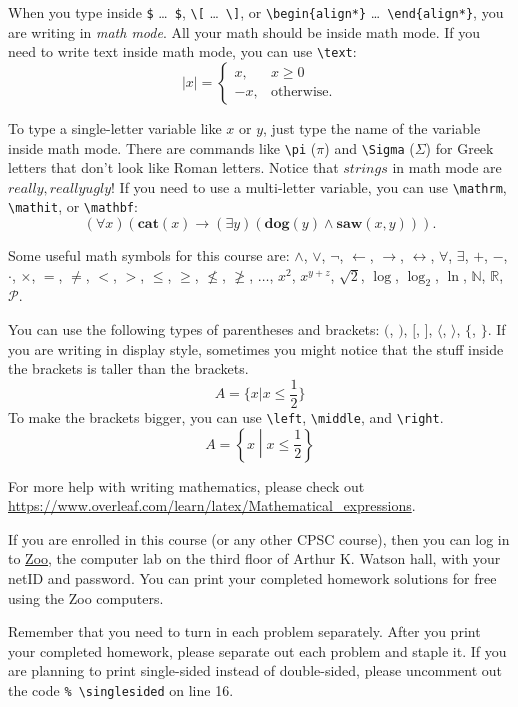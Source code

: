 \documentclass{cpsc202}
\begin{document}
    When you type inside \verb!$! \dots\ \verb!$!, \verb!\[! \dots\ \verb!\]!, or \verb!\begin{align*}! \dots\ \verb!\end{align*}!, you are writing in \textit{math mode}. All your math should be inside math mode. If you need to write text inside math mode, you can use \verb!\text!:
    \[
        |x| = \begin{cases}
            x, & x \geq 0 \\
            -x, & \text{otherwise.}
        \end{cases}
    \]
    
    To type a single-letter variable like $x$ or $y$, just type the name of the variable inside math mode. There are commands like \verb!\pi! ($\pi$) and \verb!\Sigma! ($\Sigma$) for Greek letters that don't look like Roman letters. Notice that $strings$ in math mode are $really, really ugly$! If you need to use a multi-letter variable, you can use \verb!\mathrm!, \verb!\mathit!, or \verb!\mathbf!:
    \[
    (\forall x)(\mathbf{cat}(x) \to (\exists y)(\mathbf{dog}(y) \land \mathbf{saw}(x, y))).
    \]
    
    Some useful math symbols for this course are: $\land$, $\lor$, $\lnot$, $\leftarrow$, $\rightarrow$, $\leftrightarrow$, $\forall$, $\exists$, $+$, $-$, $\cdot$, $\times$, $=$, $\neq$, $<$, $>$, $\leq$, $\geq$, $\nleq$, $\ngeq$, $\dots$, $x^2$, $x^{y + z}$, $\sqrt{2}$, $\log$, $\log_2$, $\ln$, $\mathbb{N}$, $\mathbb{R}$, $\mathcal{P}$.
    
    You can use the following types of parentheses and brackets: $($, $)$, $[$, $]$, $\langle$, $\rangle$, $\lbrace$, $\rbrace$. If you are writing in display style, sometimes you might notice that the stuff inside the brackets is taller than the brackets.
    \[
        A = \lbrace x | x \leq \frac{1}{2} \rbrace
    \]
    To make the brackets bigger, you can use \verb!\left!, \verb!\middle!, and \verb!\right!.
    \[
        A = \left\lbrace x \middle| x \leq \frac{1}{2} \right\rbrace
    \]
    
    For more help with writing mathematics, please check out \url{https://www.overleaf.com/learn/latex/Mathematical_expressions}.
    
    \nextproblem
    
    If you are enrolled in this course (or any other CPSC course), then you can log in to \hyperlink{https://zoo.cs.yale.edu/newzoo/}{Zoo}, the computer lab on the third floor of Arthur K. Watson hall, with your netID and password. You can print your completed homework solutions for free using the Zoo computers.
    
    Remember that you need to turn in each problem separately. After you print your completed homework, please separate out each problem and staple it. If you are planning to print single-sided instead of double-sided, please uncomment out the code \verb!% \singlesided! on line 16.
    
\end{document}
